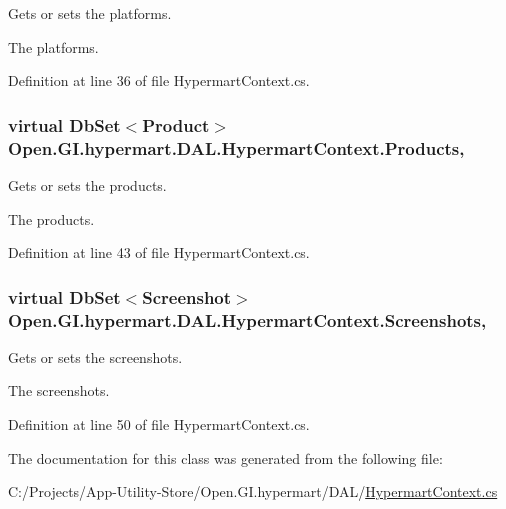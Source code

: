 Gets or sets the platforms. 

The platforms. 

Definition at line 36 of file Hypermart\+Context.\+cs.

\hypertarget{class_open_1_1_g_i_1_1hypermart_1_1_d_a_l_1_1_hypermart_context_a2673d17b8a620d2f9f11f44edd5d86ef}{}
\subsubsection[{Products}]{\setlength{\rightskip}{0pt plus 5cm}virtual Db\+Set$<${\bf Product}$>$ Open.\+G\+I.\+hypermart.\+D\+A\+L.\+Hypermart\+Context.\+Products\hspace{0.3cm}{\ttfamily [get]}, {\ttfamily [set]}}\label{class_open_1_1_g_i_1_1hypermart_1_1_d_a_l_1_1_hypermart_context_a2673d17b8a620d2f9f11f44edd5d86ef}


Gets or sets the products. 

The products. 

Definition at line 43 of file Hypermart\+Context.\+cs.

\hypertarget{class_open_1_1_g_i_1_1hypermart_1_1_d_a_l_1_1_hypermart_context_a267136fa00e08f78b49a0a888e548bef}{}
\subsubsection[{Screenshots}]{\setlength{\rightskip}{0pt plus 5cm}virtual Db\+Set$<${\bf Screenshot}$>$ Open.\+G\+I.\+hypermart.\+D\+A\+L.\+Hypermart\+Context.\+Screenshots\hspace{0.3cm}{\ttfamily [get]}, {\ttfamily [set]}}\label{class_open_1_1_g_i_1_1hypermart_1_1_d_a_l_1_1_hypermart_context_a267136fa00e08f78b49a0a888e548bef}


Gets or sets the screenshots. 

The screenshots. 

Definition at line 50 of file Hypermart\+Context.\+cs.



The documentation for this class was generated from the following file\+:\begin{DoxyCompactItemize}
\item 
C\+:/\+Projects/\+App-\/\+Utility-\/\+Store/\+Open.\+G\+I.\+hypermart/\+D\+A\+L/\hyperlink{_hypermart_context_8cs}{Hypermart\+Context.\+cs}\end{DoxyCompactItemize}
